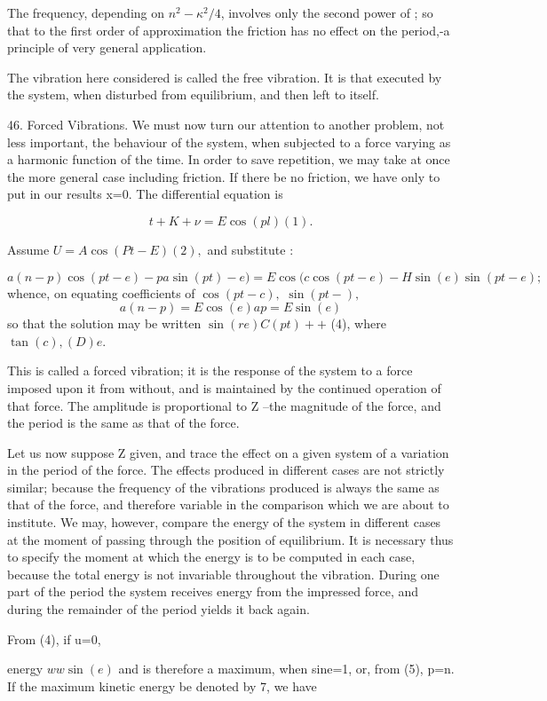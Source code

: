 The frequency, depending on
\( n^2 - \kappa^2/4 \), involves only the second power of ; so that
to the first order of approximation the friction has no effect on the period,-a
principle of very general application.

The vibration here considered is called the free vibration. It is that executed
by the system, when disturbed from equilibrium, and then left to itself.

46. Forced Vibrations.  We must now turn our attention to another problem, not
less important, the behaviour of the system, when subjected to a force varying
as a harmonic function of the time. In order to save repetition, we may take at
once the more general case including friction. If there be no friction, we have
only to put in our results x=0. The differential equation is

\[t + K + \nu = E \cos(pl) (1).\]

Assume \(U =A \cos(Pt -E) (2),\) and substitute :

\[a (n  - p ) \cos(pt-e) - pa \sin(pt)- e) = E \cos(c \cos(pt-e) - H \sin(e) \sin(pt-e); \]
whence, on equating coefficients of \(\cos(pt-c),\)
\(\sin(pt-),\)
\[a(n - p ) = E \cos(e) a p= E \sin(e)\]
so that the solution
may be written \(\sin(re) C (pt) ++\) (4), where \(\tan(c), (D)e\).

This is called a forced vibration; it is the response of the system to a force
imposed upon it from without, and is maintained by the continued operation of
that force. The amplitude is proportional to Z --the magnitude of the force,
and the period is the same as that of the force.

Let us now suppose Z given, and trace the effect on a given system of a
variation in the period of the force. The effects produced in different cases
are not strictly similar; because the frequency of the vibrations produced is
always the same as that of the force, and therefore variable in the comparison
which we are about to institute. We may, however, compare the energy of the
system in different cases at the moment of passing through the position of
equilibrium. It is necessary thus to specify the moment at which the energy is
to be computed in each case, because the total energy is not invariable
throughout the vibration.  During one part of the period the system receives
energy from the impressed force, and during the remainder of the period yields
it back again.

From (4), if u=0,

energy \(w w \sin(e)\) and is therefore a maximum, when sine=1, or, from (5),
p=n. If the maximum kinetic energy be denoted by 7, we have

